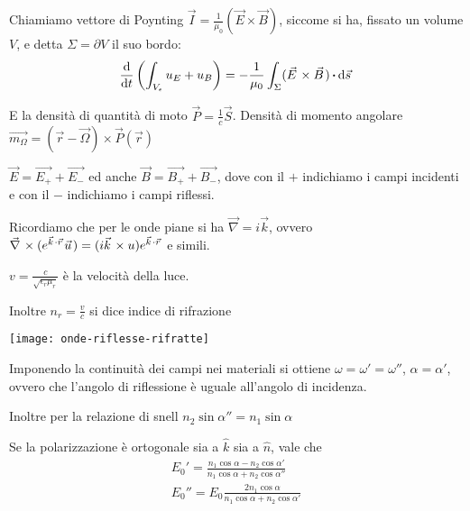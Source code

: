 \documentclass[10pt,a4paper]{article}
\newcommand{\de}{{\ensuremath{ \mbox{d}}}}
\begin{document}
\begin{multicols}{2}
  Chiamiamo vettore di Poynting
  $\vec{I} = \frac{1}{\mu_0} (\vec{E} \times \vec{B})$, siccome si ha,
  fissato un volume $V$, e detta $\Sigma = \partial V$ il suo bordo:
  $$\frac{\de}{\de t} \lrt{\int_{V_\epsilon} u_E + u_B} = -
  \frac{1}{\mu_0} \int_\Sigma (\vec{E} \times \vec{B}) \dotp \de{\vec{s}}$$
    
  E la densità di quantità di moto $\vec P = \frac{1}{c} \vec S$. Densità di momento angolare $\vec{m_\Omega} = (\vec r - \vec \Omega) \times \vec{P}(\vec r)$
  
  \begin{paragrafo}
    $\vec E = \vec{E_+} + \vec{E_-}$ ed
    anche $\vec B = \vec{B_+} + \vec{B_-}$, dove con il $+$ indichiamo i
    campi incidenti e con il $-$ indichiamo i campi riflessi.
    
    
    Ricordiamo che per le onde piane si ha $\vec{\nabla} = i \vec{k}$, ovvero $\rot (e^{\vec k \cdot \vec r} \vec u) = (i \vec{k} \times u) e^{\vec k \cdot \vec r}$ e simili.
  \end{paragrafo}
  
  \begin{paragrafo}
    $v = \frac{c}{\sqrt{\epsilon_r \mu_r}}$ è la velocità della luce.
    
    Inoltre $n_r = \frac{v}{c}$ si dice indice di rifrazione
  \end{paragrafo}
  
  \begin{paragrafo}
    \begin{center}
      \texttt{[image: onde-riflesse-rifratte]}
    \end{center}
    
    Imponendo la continuità dei campi nei materiali si ottiene $\omega =
    \omega' = \omega''$, $\alpha = \alpha'$, ovvero che l'angolo di
    riflessione è uguale all'angolo di incidenza.
    
    Inoltre per la relazione di snell
    $n_2 \sin \alpha'' = n_1 \sin \alpha$
    
    Se la polarizzazione è ortogonale sia a $\hat{k}$ sia a $\hat{n}$,
    vale che
    \begin{displaymath}
      \begin{array}{c}
        E_0' = \frac{n_1 \cos \alpha - n_2 \cos \alpha'}{n_1 \cos \alpha + n_2 \cos \alpha''} \\
        E_0'' = E_0 \frac{2 n_1 \cos \alpha}{n_1 \cos \alpha + n_2 \cos \alpha'}              \\
      \end{array}
    \end{displaymath}
  \end{paragrafo}
  

\end{multicols}
\end{document}
